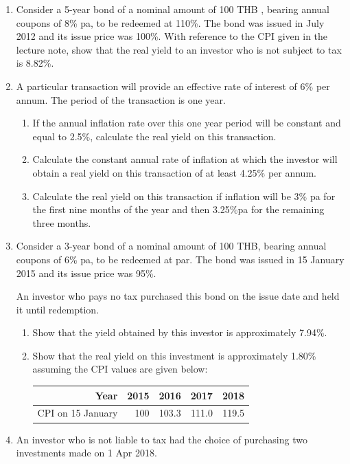 \documentclass[
]{book}
\theoremstyle{definition}
\theoremstyle{definition}
\theoremstyle{definition}
\theoremstyle{definition}
\theoremstyle{remark}
\begin{document}
\begin{enumerate}
\def\labelenumi{\arabic{enumi}.}
\item
  Consider a 5-year bond of a nominal amount of 100 THB , bearing annual
  coupons of 8\% pa, to be redeemed at 110\%. The bond was issued in
  July 2012 and its issue price was 100\%. With reference to the CPI
  given in the lecture note, show that the real yield to an investor
  who is not subject to tax is 8.82\%.
\item
  A particular transaction will provide an effective rate of interest
  of 6\% per annum. The period of the transaction is one year.

  \begin{enumerate}
  \def\labelenumii{\arabic{enumii}.}
  \item
    If the annual inflation rate over this one year period will be
    constant and equal to 2.5\%, calculate the real yield on this
    transaction.
  \item
    Calculate the constant annual rate of inflation at which the
    investor will obtain a real yield on this transaction of at
    least 4.25\% per annum.
  \item
    Calculate the real yield on this transaction if inflation will
    be 3\% pa for the first nine months of the year and then 3.25\%pa
    for the remaining three months.
  \end{enumerate}
\item
  Consider a 3-year bond of a nominal amount of 100 THB, bearing annual
  coupons of 6\% pa, to be redeemed at par. The bond was issued in 15
  January 2015 and its issue price was 95\%.

  An investor who pays no tax purchased this bond on the issue date
  and held it until redemption.

  \begin{enumerate}
  \def\labelenumii{\arabic{enumii}.}
  \item
    Show that the yield obtained by this investor is approximately
    7.94\%.
  \item
    Show that the real yield on this investment is approximately
    1.80\% assuming the CPI values are given below:

    \begin{longtable}[]{@{}rrrrr@{}}
    \toprule\noalign{}
    Year & 2015 & 2016 & 2017 & 2018 \\
    \midrule\noalign{}
    \endhead
    \bottomrule\noalign{}
    \endlastfoot
    CPI on 15 January & 100 & 103.3 & 111.0 & 119.5 \\
    \end{longtable}
  \end{enumerate}
\item
  An investor who is not liable to tax had the choice of purchasing
  two investments made on 1 Apr 2018.


\end{enumerate}
\end{document}
